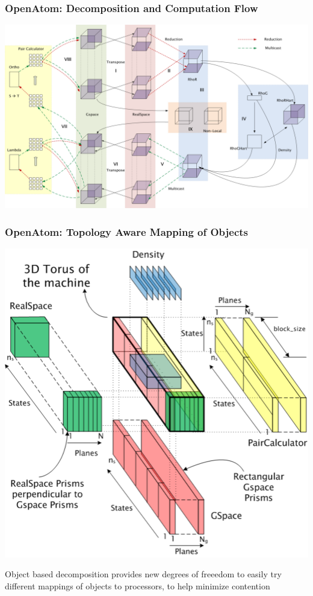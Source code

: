 \begin{frame}[t]
\frametitle{OpenAtom: Decomposition and Computation Flow}
  \begin{center} \includegraphics[width=\textwidth]{figures/openatom_array.pdf} \end{center}
\end{frame}

\begin{frame}[t]
\frametitle{OpenAtom: Topology Aware Mapping of Objects}
  \begin{center} \includegraphics[width=.45\textwidth]{figures/openatom_topo.pdf} \end{center}
  Object based decomposition provides new degrees of freeedom to easily try
  different mappings of objects to processors, to help minimize contention

\end{frame}
